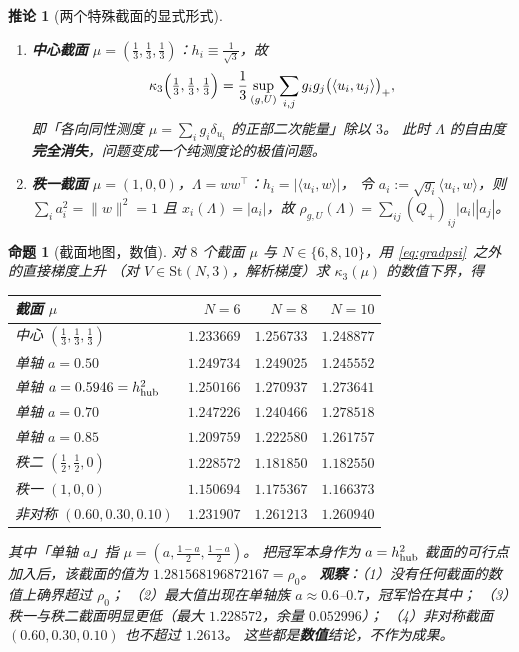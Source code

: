 \documentclass[UTF8,11pt]{ctexart}
\newtheorem{proposition}[theorem]{命题}
\newtheorem{corollary}[theorem]{推论}
\theoremstyle{definition}
\newcommand{\Lam}{\Lambda}
\begin{document}
\begin{corollary}[两个特殊截面的显式形式]\label{cor:sectspecial}
\begin{enumerate}\itemsep3pt
\item[(i)] \textbf{中心截面} $\mu=(\frac13,\frac13,\frac13)$：$h_i\equiv\frac1{\sqrt3}$，故
\begin{equation}\label{eq:center}
\kappa_3\Bigl(\tfrac13,\tfrac13,\tfrac13\Bigr)=\frac13\sup_{(g,U)}\sum_{i,j}g_ig_j\bigl(\langle u_i,u_j\rangle\bigr)_+ ,
\end{equation}
即「各向同性测度 $\mu=\sum_ig_i\delta_{u_i}$ 的正部二次能量」除以 $3$。
此时 $\Lam$ 的自由度\textbf{完全消失}，问题变成一个纯测度论的极值问题。
\item[(ii)] \textbf{秩一截面} $\mu=(1,0,0)$，$\Lam=ww^\top$：$h_i=|\langle u_i,w\rangle|$，
令 $a_i:=\sqrt{g_i}\langle u_i,w\rangle$，则 $\sum_ia_i^2=\|w\|^2=1$ 且 $x_i(\Lam)=|a_i|$，故
$\rho_{g,U}(\Lam)=\sum_{ij}(Q_+)_{ij}|a_i||a_j|$。
\end{enumerate}
\end{corollary}

\begin{proposition}[截面地图，数值]\label{prop:sectmap}
对 $8$ 个截面 $\mu$ 与 $N\in\{6,8,10\}$，用 \eqref{eq:gradpsi}~之外的直接梯度上升
（对 $V\in\mathrm{St}(N,3)$，解析梯度）求 $\kappa_3(\mu)$ 的数值下界，得
\begin{center}\small
\begin{tabular}{lrrr}
\toprule
截面 $\mu$ & $N=6$ & $N=8$ & $N=10$ \\
\midrule
中心 $(\frac13,\frac13,\frac13)$ & $1.233669$ & $1.256733$ & $1.248877$ \\
单轴 $a=0.50$ & $1.249734$ & $1.249025$ & $1.245552$ \\
单轴 $a=0.5946=h_{\rm hub}^2$ & $1.250166$ & $1.270937$ & $1.273641$ \\
单轴 $a=0.70$ & $1.247226$ & $1.240466$ & $1.278518$ \\
单轴 $a=0.85$ & $1.209759$ & $1.222580$ & $1.261757$ \\
秩二 $(\frac12,\frac12,0)$ & $1.228572$ & $1.181850$ & $1.182550$ \\
秩一 $(1,0,0)$ & $1.150694$ & $1.175367$ & $1.166373$ \\
非对称 $(0.60,0.30,0.10)$ & $1.231907$ & $1.261213$ & $1.260940$ \\
\bottomrule
\end{tabular}
\end{center}
其中「单轴 $a$」指 $\mu=(a,\frac{1-a}2,\frac{1-a}2)$。
把冠军本身作为 $a=h_{\rm hub}^2$ 截面的可行点加入后，该截面的值为 $1.281568196872167=\rho_0$。
\textbf{观察}：（1）没有任何截面的数值上确界超过 $\rho_0$；
（2）最大值出现在单轴族 $a\approx0.6$--$0.7$，冠军恰在其中；
（3）秩一与秩二截面明显更低（最大 $1.228572$，余量 $0.052996$）；
（4）非对称截面 $(0.60,0.30,0.10)$ 也不超过 $1.2613$。
这些都是\textbf{数值}结论，不作为成果。
\end{proposition}
\end{document}
